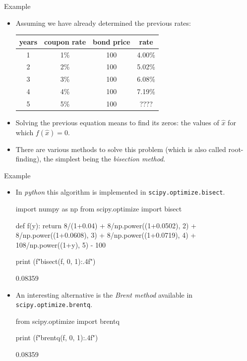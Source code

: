 \documentclass{beamer}
\begin{document}
 \begin{frame}[fragile]{Example}
 \begin{itemize}
 \item Assuming we have already determined the previous rates:
 \begin{tabular}{|c|c|c|c|}
 \hline
  years & coupon rate & bond price & rate \\
 \hline
 1 & 1\% & 100 & 4.00\% \\
 \hline
 2 & 2\% & 100 & 5.02\% \\
 \hline
 3 & 3\% & 100 & 6.08\% \\
 \hline
 4 & 4\% & 100 & 7.19\% \\
 \hline
 5 & 5\% & 100 & ???? \\
 \hline
 \end{tabular}
 
 \item Solving the previous equation means to find its zeros: the values of $\hat{x}$ for which $f(\hat{x})=0$.
 \item There are various methods to solve this problem (which is also called root-finding), the simplest being the \emph{bisection method}.
 \end{itemize}
 \end{frame} 
 
\begin{frame}[fragile]{Example}
\begin{itemize}
 \item In \emph{python} this algorithm is implemented in \texttt{scipy.optimize.bisect}.
 
\begin{ipython}
import numpy as np
from scipy.optimize import bisect
 
def f(y):
    return 8/(1+0.04) + 8/np.power((1+0.0502), 2) + 8/np.power((1+0.0608), 3) + 8/np.power((1+0.0719), 4) + 108/np.power((1+y), 5) - 100
 
print (f"{bisect(f, 0, 1):.4f}")
\end{ipython}
\begin{ioutput} 
 0.08359
\end{ioutput} 
\item An interesting alternative is the \emph{Brent method} available in \texttt{scipy.optimize.brentq}.

\begin{ipython}
from scipy.optimize import brentq
 
print (f"{brentq(f, 0, 1):.4f}")
\end{ipython}
\begin{ioutput} 
 0.08359
\end{ioutput} 
 \end{itemize}
 \end{frame} 
 
\end{document}
